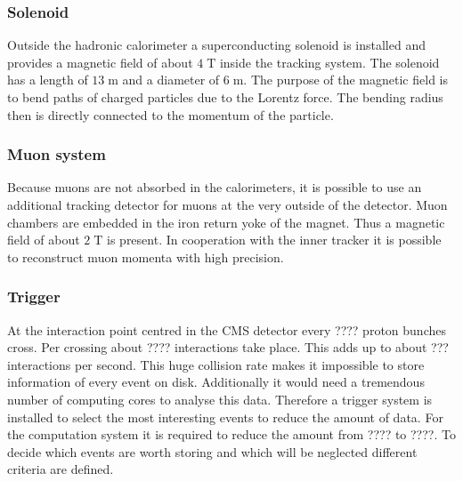 \subsubsection{Solenoid}
	Outside the hadronic calorimeter a superconducting solenoid is installed and provides a magnetic field of about $4\;\text{T}$ inside the tracking system. The solenoid has a length of $13\;\text{m}$ and a diameter of $6\;\text{m}$. The purpose of the magnetic field is to bend paths of charged particles due to the Lorentz force. The bending radius then is directly connected to the momentum of the particle.  
\subsubsection{Muon system}
	Because muons are not absorbed in the calorimeters, it is possible to use an additional tracking detector for muons at the very outside of the detector. Muon chambers are embedded in the iron return yoke of the magnet. Thus a magnetic field of about $2\;\text{T}$ is present.
	In cooperation with the inner tracker it is possible to reconstruct muon momenta with high precision.
\subsubsection{Trigger}
	At the interaction point centred in the CMS detector every ???? 
	proton bunches cross. Per crossing about ????
	interactions take place. This adds up to about ???
	interactions per second. This huge collision rate makes it impossible to store information of every event on disk. Additionally it would need a tremendous number of computing cores to analyse this data. Therefore a trigger system is installed to select the most interesting events to reduce the amount of data. For the computation system it is required to reduce the amount from ???? to ????.
 	To decide which events are worth storing and which will be neglected different criteria are defined.
	
	